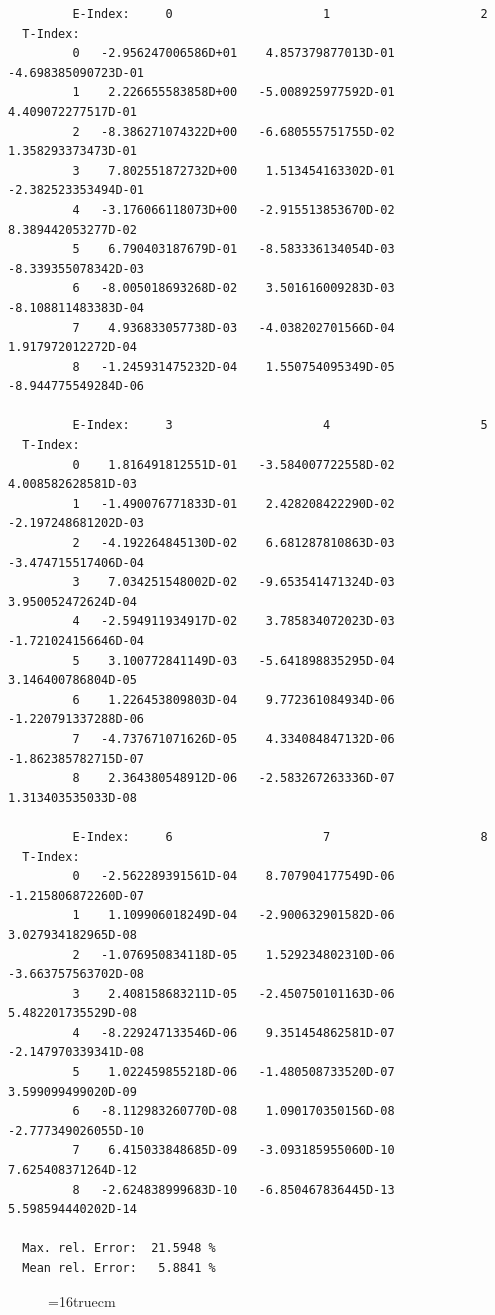 \documentclass[12pt,dvips]{article}
\begin{document}
\begin{small}\begin{verbatim}
         E-Index:     0                     1                     2
  T-Index:
         0   -2.956247006586D+01    4.857379877013D-01   -4.698385090723D-01
         1    2.226655583858D+00   -5.008925977592D-01    4.409072277517D-01
         2   -8.386271074322D+00   -6.680555751755D-02    1.358293373473D-01
         3    7.802551872732D+00    1.513454163302D-01   -2.382523353494D-01
         4   -3.176066118073D+00   -2.915513853670D-02    8.389442053277D-02
         5    6.790403187679D-01   -8.583336134054D-03   -8.339355078342D-03
         6   -8.005018693268D-02    3.501616009283D-03   -8.108811483383D-04
         7    4.936833057738D-03   -4.038202701566D-04    1.917972012272D-04
         8   -1.245931475232D-04    1.550754095349D-05   -8.944775549284D-06

         E-Index:     3                     4                     5
  T-Index:
         0    1.816491812551D-01   -3.584007722558D-02    4.008582628581D-03
         1   -1.490076771833D-01    2.428208422290D-02   -2.197248681202D-03
         2   -4.192264845130D-02    6.681287810863D-03   -3.474715517406D-04
         3    7.034251548002D-02   -9.653541471324D-03    3.950052472624D-04
         4   -2.594911934917D-02    3.785834072023D-03   -1.721024156646D-04
         5    3.100772841149D-03   -5.641898835295D-04    3.146400786804D-05
         6    1.226453809803D-04    9.772361084934D-06   -1.220791337288D-06
         7   -4.737671071626D-05    4.334084847132D-06   -1.862385782715D-07
         8    2.364380548912D-06   -2.583267263336D-07    1.313403535033D-08

         E-Index:     6                     7                     8
  T-Index:
         0   -2.562289391561D-04    8.707904177549D-06   -1.215806872260D-07
         1    1.109906018249D-04   -2.900632901582D-06    3.027934182965D-08
         2   -1.076950834118D-05    1.529234802310D-06   -3.663757563702D-08
         3    2.408158683211D-05   -2.450750101163D-06    5.482201735529D-08
         4   -8.229247133546D-06    9.351454862581D-07   -2.147970339341D-08
         5    1.022459855218D-06   -1.480508733520D-07    3.599099499020D-09
         6   -8.112983260770D-08    1.090170350156D-08   -2.777349026055D-10
         7    6.415033848685D-09   -3.093185955060D-10    7.625408371264D-12
         8   -2.624838999683D-10   -6.850467836445D-13    5.598594440202D-14

  Max. rel. Error:  21.5948 %
  Mean rel. Error:   5.8841 %

\end{verbatim}\end{small}
\begin{figure} \label{2.3.13d}
\epsfxsize=16truecm
\end{figure}
\newpage
\end{document}
